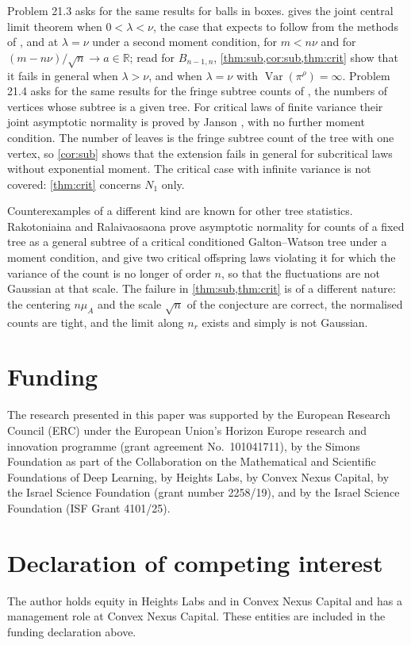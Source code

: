 \documentclass[11pt]{amsart}
\theoremstyle{definition}
\newcommand{\R}{\mathbb{R}}
\DeclareMathOperator{\Var}{Var}
\begin{document}
Problem 21.3 asks for the same results for balls in boxes.  gives the joint central limit theorem when $0<\lambda<\nu$, the case that \cite{Janson12} expects to follow from the methods of \cite{Janson01}, and at $\lambda=\nu$ under a second moment condition, for $m<n\nu$ and for $(m-n\nu)/\sqrt n\to a\in\R$; read for $B_{n-1,n}$, \cref{thm:sub,cor:sub,thm:crit} show that it fails in general when $\lambda>\nu$, and when $\lambda=\nu$ with $\Var(\pi^\rho)=\infty$. Problem 21.4 asks for the same results for the fringe subtree counts of \cite[Theorem 7.12]{Janson12}, the numbers of vertices whose subtree is a given tree. For critical laws of finite variance their joint asymptotic normality is proved by Janson \cite[Corollary 1.8]{Janson16}, with no further moment condition. The number of leaves is the fringe subtree count of the tree with one vertex, so \cref{cor:sub} shows that the extension fails in general for subcritical laws without exponential moment. The critical case with infinite variance is not covered: \cref{thm:crit} concerns $N_1$ only.

Counterexamples of a different kind are known for other tree statistics. Rakotoniaina and Ralaivaosaona \cite{RR} prove asymptotic normality for counts of a fixed tree as a general subtree of a critical conditioned Galton--Watson tree under a moment condition, and give two critical offspring laws violating it for which the variance of the count is no longer of order $n$, so that the fluctuations are not Gaussian at that scale. The failure in \cref{thm:sub,thm:crit} is of a different nature: the centering $n\mu_A$ and the scale $\sqrt n$ of the conjecture are correct, the normalised counts are tight, and the limit along $n_r$ exists and simply is not Gaussian.

\section*{Funding}
The research presented in this paper was supported by the European Research Council (ERC) under the European Union's Horizon Europe research and innovation programme (grant agreement No.~101041711), by the Simons Foundation as part of the Collaboration on the Mathematical and Scientific Foundations of Deep Learning, by Heights Labs, by Convex Nexus Capital, by the Israel Science Foundation (grant number 2258/19), and by the Israel Science Foundation (ISF Grant 4101/25).

\section*{Declaration of competing interest}
The author holds equity in Heights Labs and in Convex Nexus Capital and has a management role at Convex Nexus Capital. These entities are included in the funding declaration above.
\end{document}
